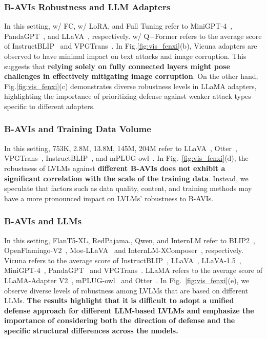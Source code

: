 \subsubsection{B-AVIs Robustness and LLM Adapters} 
In this setting, w/ FC, w/ LoRA, and Full Tuning refer to MiniGPT-4~\cite{zhu2023minigpt}, PandaGPT~\cite{su2023pandagpt}, and LLaVA~\cite{llava}, respectively.
w/ Q$-$Former refers to the average score of InstructBLIP~\cite{dai2023instructblip} and VPGTrans~\cite{zhang2023vpgtrans}.
In Fig.\ref{fig:vis_fenxi}(b), Vicuna adapters\cite{vicuna} are observed to have minimal impact on text attacks and image corruption. This suggests that \textbf{relying solely on fully connected layers might pose challenges in effectively mitigating image corruption}. On the other hand, Fig.\ref{fig:vis_fenxi}(c) demonstrates diverse robustness levels in LLaMA\cite{touvron2023llama} adapters, highlighting the importance of prioritizing defense against weaker attack types specific to different adapters.

\subsubsection{B-AVIs and Training Data Volume} 
In this setting,  753K, 2.8M, 13.8M, 145M, 204M refer to LLaVA~\cite{llava}, Otter~\cite{li2023otter}, VPGTrans~\cite{zhang2023vpgtrans}, InstructBLIP~\cite{dai2023instructblip}, and mPLUG-owl~\cite{ye2023mplug}.
In Fig.~\ref{fig:vis_fenxi}(d), the robustness of LVLMs against \textbf{different B-AVIs does not exhibit a significant correlation with the scale of the training data}. Instead, we speculate that factors such as data quality, content, and training methods may have a more pronounced impact on LVLMs' robustness to B-AVIs.

\subsubsection{B-AVIs and LLMs} 
In this setting, FlanT5-XL, RedPajama., Qwen, and InternLM refer to BLIP2~\cite{li2023blip}, OpenFlamingo-V2~\cite{openfamingov2}, Moe-LLaVA~\cite{lin2024moe} and InternLM-XComposer~\cite{zhang2023internlm}, respectively.
Vicuna refers to the average score of InstructBLIP~\cite{dai2023instructblip}, LLaVA~\cite{llava}, LLaVA-1.5~\cite{liu2023improved}, MiniGPT-4~\cite{zhu2023minigpt}, PandaGPT~\cite{su2023pandagpt} and VPGTrans~\cite{zhang2023vpgtrans}.
LLaMA refers to the average score of LLaMA-Adapter V2~\cite{gao2023llama}, mPLUG-owl~\cite{ye2023mplug} and Otter~\cite{li2023otter}.
In Fig.~\ref{fig:vis_fenxi}(e), we observe diverse levels of robustness among LVLMs that are based on different LLMs. \textbf{The results highlight that it is difficult to adopt a unified defense approach for different LLM-based LVLMs and emphasize the importance of considering both the direction of defense and the specific structural differences across the models.}


